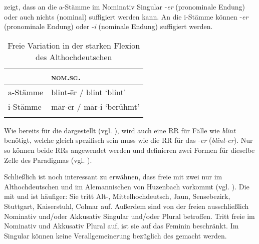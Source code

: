  zeigt, dass an die a-Stäm\-me im Nominativ Singular -\textit{er} (pronominale Endung) oder auch nichts (nominal) suffigiert werden kann. An die i-Stäm\-me können -\textit{er} (pronominale Endung) oder -\textit{i} (nominale Endung) suffigiert werden.


\begin{table}
\caption{Freie Variation in der starken Flexion des Althochdeutschen \citep[220, 223]{Braune2004}}\label{table5.17}
\begin{tabular}{ll}
\lsptoprule
& \textsc{nom.sg.}\\\midrule
{a-Stämme} & blint-\=er / blint ‘blint’\\
{i-Stämme} & m\=ar-\=er / m\=ar-i ‘berühmt’\\
\lspbottomrule
\end{tabular}
\end{table}

Wie bereits für die  dargestellt (vgl. ), wird auch eine RR für Fälle wie \textit{blint} benötigt, welche gleich spezifisch sein muss wie die RR für das  -\textit{er} (\textit{blint-er}). Nur so können beide RRs angewendet werden und definieren zwei Formen für dieselbe Zelle des Paradigmas (vgl. ).

Schließlich ist noch interessant zu erwähnen, dass freie  mit zwei  nur im Althochdeutschen und im Alemannischen von Huzenbach vorkommt (vgl. ). Die  mit  und  ist häufiger: Sie tritt Alt-, Mittelhochdeutsch, Jaun, Sensebezirk, Stuttgart, Kaiserstuhl, Colmar auf. Außerdem sind von der freien  ausschließlich Nominativ und/oder Akkusativ Singular und/oder Plural betroffen. Tritt freie  im Nominativ und Akkusativ Plural auf, ist sie auf das Feminin beschränkt. Im Singular können keine Verallgemeinerung bezüglich des  gemacht werden.

